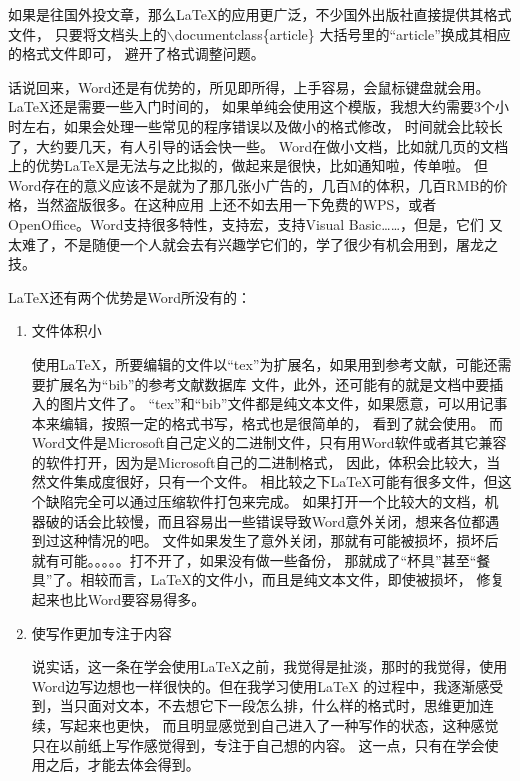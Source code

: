 如果是往国外投文章，那么\LaTeX{}的应用更广泛，不少国外出版社直接提供其格式文件，
只要将文档头上的$\backslash$documentclass\{article\} 大括号里的“article”换成其相应的格式文件即可，
避开了格式调整问题。

话说回来，Word还是有优势的，所见即所得，上手容易，会鼠标键盘就会用。\LaTeX{}还是需要一些入门时间的，
如果单纯会使用这个模版，我想大约需要3个小时左右，如果会处理一些常见的程序错误以及做小的格式修改，
时间就会比较长了，大约要几天，有人引导的话会快一些。
Word在做小文档，比如就几页的文档上的优势\LaTeX{}{}是无法与之比拟的，做起来是很快，比如通知啦，传单啦。
但Word存在的意义应该不是就为了那几张小广告的，几百M的体积，几百RMB的价格，当然盗版很多。在这种应用
上还不如去用一下免费的WPS，或者OpenOffice。Word支持很多特性，支持宏，支持Visual Basic……，但是，它们
又太难了，不是随便一个人就会去有兴趣学它们的，学了很少有机会用到，屠龙之技。

\LaTeX{}{}还有两个优势是Word所没有的：
\begin{enumerate}
\item{文件体积小}

使用\LaTeX{}{}，所要编辑的文件以“tex”为扩展名，如果用到参考文献，可能还需要扩展名为“bib”的参考文献数据库
文件，此外，还可能有的就是文档中要插入的图片文件了。
“tex”和“bib”文件都是纯文本文件，如果愿意，可以用记事本来编辑，按照一定的格式书写，格式也是很简单的，
看到了就会使用。
而Word文件是Microsoft自己定义的二进制文件，只有用Word软件或者其它兼容的软件打开，因为是Microsoft自己的二进制格式，
因此，体积会比较大，当然文件集成度很好，只有一个文件。
相比较之下\LaTeX{}{}可能有很多文件，但这个缺陷完全可以通过压缩软件打包来完成。
如果打开一个比较大的文档，机器破的话会比较慢，而且容易出一些错误导致Word意外关闭，想来各位都遇到过这种情况的吧。
文件如果发生了意外关闭，那就有可能被损坏，损坏后就有可能。。。。。打不开了，如果没有做一些备份，
那就成了“杯具”甚至“餐具”了。相较而言，\LaTeX{}{}的文件小，而且是纯文本文件，即使被损坏，
修复起来也比Word要容易得多。

\item{使写作更加专注于内容}

说实话，这一条在学会使用\LaTeX{}{}之前，我觉得是扯淡，那时的我觉得，使用Word边写边想也一样很快的。但在我学习使用\LaTeX{}{}
的过程中，我逐渐感受到，当只面对文本，不去想它下一段怎么排，什么样的格式时，思维更加连续，写起来也更快，
而且明显感觉到自己进入了一种写作的状态，这种感觉只在以前纸上写作感觉得到，专注于自己想的内容。
这一点，只有在学会使用之后，才能去体会得到。

\end{enumerate}


